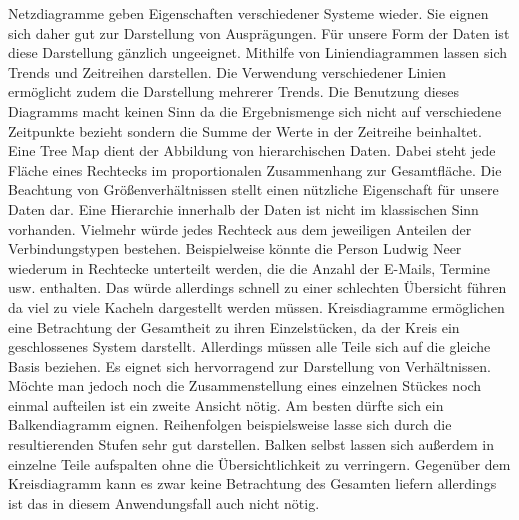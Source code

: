 Netzdiagramme geben Eigenschaften verschiedener Systeme wieder. Sie eignen sich daher gut zur Darstellung von Ausprägungen. Für unsere Form der Daten ist diese Darstellung gänzlich ungeeignet. Mithilfe von Liniendiagrammen lassen sich Trends und Zeitreihen darstellen. Die Verwendung verschiedener Linien ermöglicht zudem die Darstellung mehrerer Trends. Die Benutzung dieses Diagramms macht keinen Sinn da die Ergebnismenge sich nicht auf verschiedene Zeitpunkte bezieht sondern die Summe der Werte in der Zeitreihe beinhaltet. Eine Tree Map dient der Abbildung von hierarchischen Daten. Dabei steht jede Fläche eines Rechtecks im proportionalen Zusammenhang zur Gesamtfläche. Die Beachtung von Größenverhältnissen stellt einen nützliche Eigenschaft für unsere Daten dar. Eine Hierarchie innerhalb der Daten ist nicht im klassischen Sinn vorhanden. Vielmehr würde jedes Rechteck aus dem jeweiligen Anteilen der Verbindungstypen bestehen. Beispielweise könnte die Person Ludwig Neer wiederum in Rechtecke unterteilt werden, die die Anzahl der E-Mails, Termine usw. enthalten. Das würde allerdings schnell zu einer schlechten Übersicht führen da viel zu viele Kacheln dargestellt werden müssen. Kreisdiagramme ermöglichen eine Betrachtung der Gesamtheit zu ihren Einzelstücken, da der Kreis ein geschlossenes System darstellt. Allerdings müssen alle Teile sich auf die gleiche Basis beziehen. Es eignet sich hervorragend zur Darstellung von Verhältnissen. Möchte man jedoch noch die Zusammenstellung eines einzelnen Stückes noch einmal aufteilen ist ein zweite Ansicht nötig. Am besten dürfte sich ein Balkendiagramm eignen. Reihenfolgen beispielsweise lasse sich durch die resultierenden Stufen sehr gut darstellen. Balken selbst lassen sich außerdem in einzelne Teile aufspalten ohne die Übersichtlichkeit zu verringern. Gegenüber dem Kreisdiagramm kann es zwar keine Betrachtung des Gesamten liefern allerdings ist das in diesem Anwendungsfall auch nicht nötig. 


